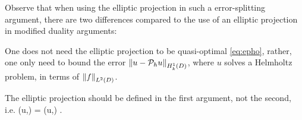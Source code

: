 
Observe that when using the elliptic projection in such a error-splitting argument, there are two differences compared to the use of an elliptic projection in modified duality arguments:
\ben
\item One does not need the elliptic projection to be quasi-optimal \cref{eq:epho}, rather, one only need to bound the error $\NHokD{u-\Ph u}$, where $u$ solves a Helmholtz problem, in terms of $\NLtD{f}$.
\item The elliptic projection should be defined in the first argument, not the second, i.e.
  \beq\label{eq:ellprojfirst}
\aT(\Ph u,\vh) = \aT(u,\vh) \tforall \vh \in \Vhp.
  \eeq
\een







